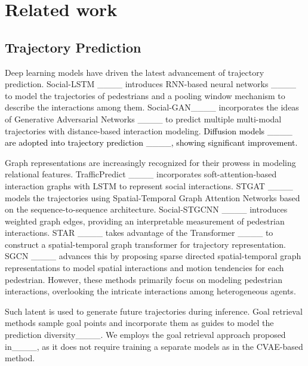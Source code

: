 \section{Related work}
\subsection{Trajectory Prediction}
\label{sec:future}

Deep learning models have driven the latest advancement of trajectory prediction. 
Social-LSTM ____ introduces RNN-based neural networks ____ to model the trajectories of pedestrians and a pooling window mechanism to describe the interactions among them. Social-GAN____ incorporates the ideas of Generative Adversarial Networks ____ to predict multiple multi-modal trajectories with distance-based interaction modeling. \textcolor{black}{Diffusion models ____ are adopted into trajectory prediction ____, showing significant improvement.}

Graph representations are increasingly recognized for their prowess in modeling relational features. TrafficPredict ____ incorporates soft-attention-based interaction graphs with LSTM to represent social interactions. STGAT ____ models the trajectories using Spatial-Temporal Graph Attention Networks based on the sequence-to-sequence architecture. Social-STGCNN ____ introduces weighted graph edges, providing an interpretable measurement of pedestrian interactions. STAR ____ takes advantage of the Transformer ____ to construct a spatial-temporal graph transformer for trajectory representation. SGCN ____ advances this by proposing sparse directed spatial-temporal graph representations to model spatial interactions and motion tendencies for each pedestrian. However, these methods primarily focus on modeling pedestrian interactions, overlooking the intricate interactions among heterogeneous agents.

 Such latent is used to generate future trajectories during inference. Goal retrieval methods sample goal points and incorporate them as guides to model the prediction diversity____. %
We employs the goal retrieval approach proposed in____, as it does not require training a separate models as in the CVAE-based method.


